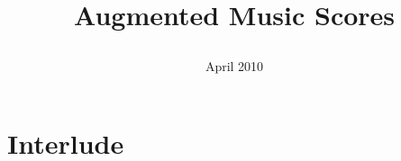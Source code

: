 \else

\newcommand{\french}[1] 	{}
\newcommand{\eng}[1] 		{#1}

\def\version{April 2010}
\def\exemple{Example}
\def\implementation{Implementation}
\def\synchronisation{Synchronization}
\def\saidempty{is said empty when }
\def\ou{or}
\def\where{where}
\def\graphic{graphic}
\def\reltime{relative time}
\def\texte{text}
\def\score{score}
\def\vectoriel{vectorial}
\def\demo{Demo}
\def\et{and}
\def\ffond{fundamental frequency}
\def\ksigcolor{constant color signal}
\def\ksigthick{constant thickness signal}
\def\ksigrms{RMS signal}
\newcommand{\rmsval}[1] 	{#1 RMS values}

\fi


\title{{\huge 
\french{Partitions musicales augmentées}
\eng{Augmented Music Scores}
}}


\date[Février 2010]{{\scriptsize \version}}




\frame{\titlepage}

\section{Interlude}
